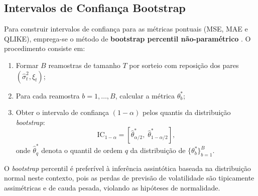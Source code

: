 \subsection{Intervalos de Confiança Bootstrap}
\label{subsec:bootstrap_ic}

Para construir intervalos de confiança para as métricas pontuais (MSE, MAE
e QLIKE), emprega-se o método de \textbf{bootstrap percentil
não-paramétrico} \cite{efron1993}. O procedimento consiste em:

\begin{enumerate}
    \item Formar $B$ reamostras de tamanho $T$ por sorteio com reposição dos
          pares $(\hat{\sigma}_t^2, \xi_t)$;
    \item Para cada reamostra $b = 1, \ldots, B$, calcular a métrica
          $\theta^{*}_b$;
    \item Obter o intervalo de confiança $(1-\alpha)$ pelos quantis da
          distribuição \emph{bootstrap}:
          \begin{equation}
              \label{eq:bootstrap_ci}
              \text{IC}_{1-\alpha} = \left[
              \hat{\theta}^{*}_{\alpha/2},\;
              \hat{\theta}^{*}_{1-\alpha/2}\right],
          \end{equation}
          onde $\hat{\theta}^{*}_{q}$ denota o quantil de ordem $q$ da
          distribuição de $\{\theta^{*}_b\}_{b=1}^{B}$.
\end{enumerate}

O \emph{bootstrap} percentil é preferível à inferência assintótica baseada
na distribuição normal neste contexto, pois as perdas de previsão de
volatilidade são tipicamente assimétricas e de cauda pesada, violando as
hipóteses de normalidade.